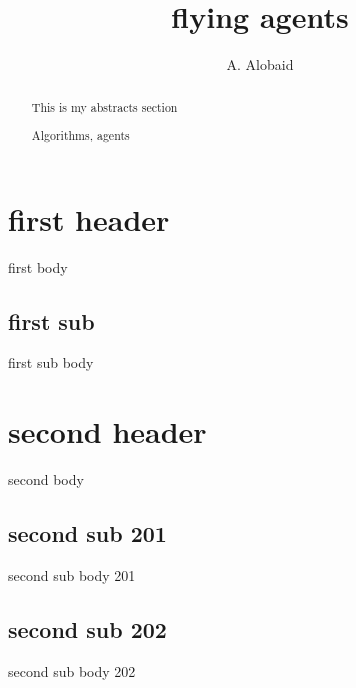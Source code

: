 \documentclass[runningheads,a4paper]{llncs}
\newcommand{\keywords}[1]{\par\addvspace\baselineskip
\noindent\keywordname\enspace\ignorespaces#1}
\begin{document}
\mainmatter
\title{flying agents}
\author{A. Alobaid}
\maketitle
\begin{abstract}
This is my abstracts section
\keywords{Algorithms, agents}
\end{abstract}
\section{first header}
first body
\subsection{first sub}
first sub body
\section{second header}
second body
\subsection{second sub 201}
second sub body 201
\subsection{second sub 202}
second sub body 202
\end{document}
